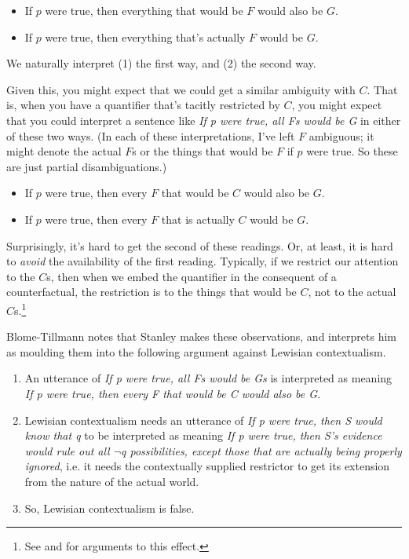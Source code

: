 \begin{itemize}
\item If $p$ were true, then everything that would be $F$ would also be $G$.
\item If $p$ were true, then everything that's actually $F$ would be $G$.
\end{itemize}

\noindent We naturally interpret (1) the first way, and (2) the second way.


\noindent Given this, you might expect that we could get a similar ambiguity with $C$. That is, when you have a quantifier that's tacitly restricted by $C$, you might expect that you could interpret a sentence like \textit{If p were true, all Fs would be G} in either of these two ways. (In each of these interpretations, I've left $F$ ambiguous; it might denote the actual \(F\)s or the things that would be \(F\) if \(p\) were true. So these are just partial disambiguations.)

\begin{itemize}
\item If $p$ were true, then every $F$ that would be $C$ would also be $G$.
\item If $p$ were true, then every $F$ that is actually $C$ would be $G$.
\end{itemize}

\noindent Surprisingly, it's hard to get the second of these readings. Or, at least, it is hard to \textit{avoid} the availability of the first reading. Typically, if we restrict our attention to the $C$s, then when we embed the quantifier in the consequent of a counterfactual, the restriction is to the things that would be $C$, not to the actual $C$s.\footnote{See \citet{Stanley2000-STAOQD} and \citet{Stanley2005-STAKAP} for arguments to this effect.} 

Blome-Tillmann notes that Stanley makes these observations, and interprets him as moulding them into the following argument against Lewisian contextualism.

\begin{enumerate}
\item An utterance of \textit{If p were true, all Fs would be Gs} is interpreted as meaning \textit{If p were true, then every F that would be C would also be G}.
\item Lewisian contextualism needs an utterance of \textit{If p were true, then S would know that q} to be interpreted as meaning \textit{If p were true, then S's evidence would rule out all $\neg$q possibilities, except those that are actually being properly ignored}, i.e. it needs the contextually supplied restrictor to get its extension from the nature of the actual world.
\item So, Lewisian contextualism is false.
\end{enumerate}

